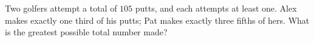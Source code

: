 Two golfers attempt a total of $105$ putts, and each attempts at least one. Alex makes exactly one third of his putts; Pat makes exactly three fifths of hers. What is the greatest possible total number made?
